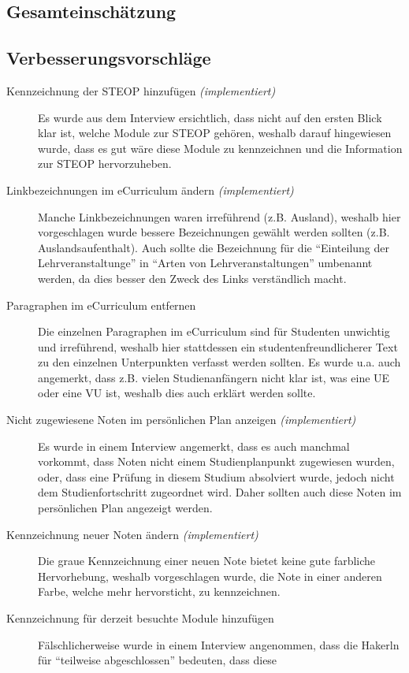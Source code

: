 \documentclass[a4paper,10pt]{scrartcl}
\begin{document}
\subsection{Gesamteinschätzung}

\subsection{Verbesserungsvorschläge}

\begin{description}
 \item[Kennzeichnung der STEOP hinzufügen \textit{(implementiert)}] Es wurde aus dem Interview ersichtlich, dass nicht auf den ersten Blick klar ist, welche Module zur STEOP gehören, weshalb darauf hingewiesen wurde, dass es gut wäre diese Module
 zu kennzeichnen und die Information zur STEOP hervorzuheben.
 \item[Linkbezeichnungen im eCurriculum ändern \textit{(implementiert)}] Manche Linkbezeichnungen waren irreführend (z.B. Ausland), weshalb hier vorgeschlagen wurde bessere Bezeichnungen gewählt werden sollten (z.B. Auslandsaufenthalt).
 Auch sollte die Bezeichnung für
die ``Einteilung der Lehrveranstaltunge'' in ``Arten von Lehrveranstaltungen'' umbenannt werden, da dies besser den Zweck des Links verständlich macht.
 \item[Paragraphen im eCurriculum entfernen] Die einzelnen Paragraphen im eCurriculum sind für Studenten unwichtig und irreführend, weshalb hier stattdessen ein studentenfreundlicherer
 Text zu den einzelnen Unterpunkten verfasst werden sollten. Es wurde u.a. auch angemerkt, dass z.B. vielen Studienanfängern nicht klar ist, was eine UE oder eine VU ist, weshalb dies auch erklärt werden sollte.
 \item[Nicht zugewiesene Noten im persönlichen Plan anzeigen \textit{(implementiert)}] Es wurde in einem Interview angemerkt, dass es auch manchmal vorkommt, dass Noten nicht einem Studienplanpunkt zugewiesen wurden, oder, dass eine Prüfung in diesem
Studium absolviert wurde, jedoch nicht dem Studienfortschritt zugeordnet wird. Daher sollten auch diese Noten im persönlichen Plan angezeigt werden.
 \item[Kennzeichnung neuer Noten ändern \textit{(implementiert)}] Die graue Kennzeichnung einer neuen Note bietet keine gute farbliche Hervorhebung, weshalb vorgeschlagen wurde, die Note in einer anderen Farbe, welche mehr hervorsticht, zu kennzeichnen.
 \item[Kennzeichnung für derzeit besuchte Module hinzufügen] Fälschlicherweise wurde in einem Interview angenommen, dass die Hakerln für ``teilweise abgeschlossen'' bedeuten, dass diese

\end{description}
\end{document}
